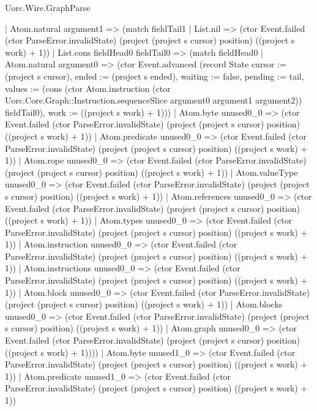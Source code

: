 \begin{lexlean}{Uorc.Wire.GraphParse}
\begin{semanticmodule}
{              | Atom.natural argument1 => (match fieldTail1
                | List.nil => (ctor Event.failed (ctor ParseError.invalidState) (project (project s cursor) position) ((project s work) + 1))
                | List.cons fieldHead0 fieldTail0 => (match fieldHead0
                  | Atom.natural argument0 => (ctor Event.advanced (record State {cursor := (project s cursor), ended := (project s ended), waiting := false, pending := tail, values := (cons (ctor Atom.instruction (ctor Uorc.Core.Graph::Instruction.sequenceSlice argument0 argument1 argument2)) fieldTail0), work := ((project s work) + 1)}))
                  | Atom.byte unused0_0 => (ctor Event.failed (ctor ParseError.invalidState) (project (project s cursor) position) ((project s work) + 1))
                  | Atom.predicate unused0_0 => (ctor Event.failed (ctor ParseError.invalidState) (project (project s cursor) position) ((project s work) + 1))
                  | Atom.rope unused0_0 => (ctor Event.failed (ctor ParseError.invalidState) (project (project s cursor) position) ((project s work) + 1))
                  | Atom.valueType unused0_0 => (ctor Event.failed (ctor ParseError.invalidState) (project (project s cursor) position) ((project s work) + 1))
                  | Atom.references unused0_0 => (ctor Event.failed (ctor ParseError.invalidState) (project (project s cursor) position) ((project s work) + 1))
                  | Atom.types unused0_0 => (ctor Event.failed (ctor ParseError.invalidState) (project (project s cursor) position) ((project s work) + 1))
                  | Atom.instruction unused0_0 => (ctor Event.failed (ctor ParseError.invalidState) (project (project s cursor) position) ((project s work) + 1))
                  | Atom.instructions unused0_0 => (ctor Event.failed (ctor ParseError.invalidState) (project (project s cursor) position) ((project s work) + 1))
                  | Atom.block unused0_0 => (ctor Event.failed (ctor ParseError.invalidState) (project (project s cursor) position) ((project s work) + 1))
                  | Atom.blocks unused0_0 => (ctor Event.failed (ctor ParseError.invalidState) (project (project s cursor) position) ((project s work) + 1))
                  | Atom.graph unused0_0 => (ctor Event.failed (ctor ParseError.invalidState) (project (project s cursor) position) ((project s work) + 1))))
              | Atom.byte unused1_0 => (ctor Event.failed (ctor ParseError.invalidState) (project (project s cursor) position) ((project s work) + 1))
              | Atom.predicate unused1_0 => (ctor Event.failed (ctor ParseError.invalidState) (project (project s cursor) position) ((project s work) + 1))
}
\end{semanticmodule}
\end{lexlean}
